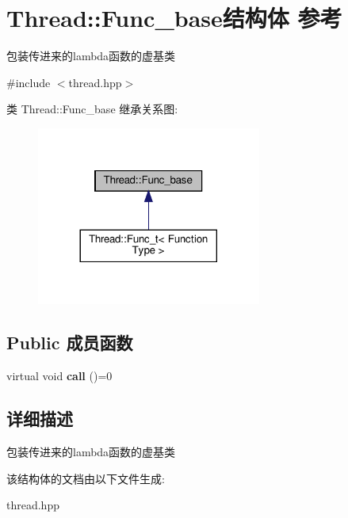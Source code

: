 \hypertarget{structThread_1_1Func__base}{}\section{Thread\+:\+:Func\+\_\+base结构体 参考}
\label{structThread_1_1Func__base}


包装传进来的lambda函数的虚基类  




{\ttfamily \#include $<$thread.\+hpp$>$}



类 Thread\+:\+:Func\+\_\+base 继承关系图\+:
\nopagebreak
\begin{figure}[H]
\begin{center}
\leavevmode
\includegraphics[width=209pt]{structThread_1_1Func__base__inherit__graph}
\end{center}
\end{figure}
\subsection*{Public 成员函数}
\begin{DoxyCompactItemize}
\item 
\mbox{\label{structThread_1_1Func__base_a53caa79f4dd5f1b90690a14e7c1e0437}} 
virtual void {\bfseries call} ()=0
\end{DoxyCompactItemize}


\subsection{详细描述}
包装传进来的lambda函数的虚基类 

该结构体的文档由以下文件生成\+:\begin{DoxyCompactItemize}
\item 
thread.\+hpp\end{DoxyCompactItemize}
